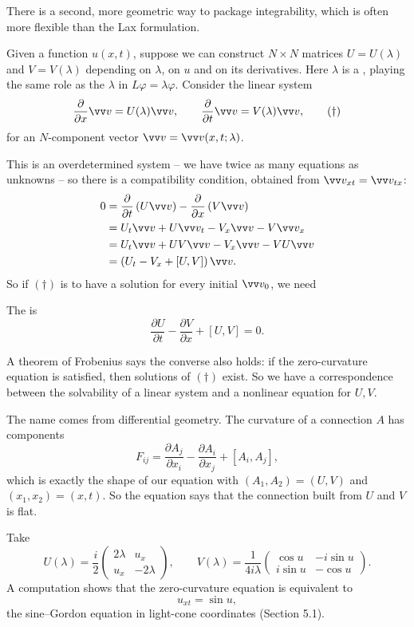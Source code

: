 There is a second, more geometric way to package integrability, which is often more flexible than the Lax formulation.

Given a function $u(x,t)$, suppose we can construct $N\times N$ matrices $U = U(\lambda)$ and $V = V(\lambda)$ depending on $\lambda$, on $u$ and on its derivatives. Here $\lambda$ is a , playing the same role as the $\lambda$ in $L\varphi = \lambda\varphi$. Consider the linear system
\begin{equation*}
\frac{\partial}{\partial x}\vv v = U(\lambda)\vv v, \qquad \frac{\partial}{\partial t}\vv v = V(\lambda)\vv v,\tag{$\dagger$}
\end{equation*}
for an $N$-component vector $\vv v = \vv v(x,t;\lambda)$.

This is an overdetermined system -- we have twice as many equations as unknowns -- so there is a compatibility condition, obtained from $\vv v_{xt} = \vv v_{tx}$:
\begin{align*}
	0 &= \frac{\partial}{\partial t}\left(U\vv v\right) - \frac{\partial}{\partial x}\left(V\vv v\right)\\
	&= U_t\vv v + U\vv v_t - V_x\vv v - V\vv v_x\\
	&= U_t\vv v + UV\vv v - V_x\vv v - VU\vv v\\
	&= \left(U_t - V_x + [U,V]\right)\vv v.
\end{align*}
So if $(\dagger)$ is to have a solution for every initial $\vv v_0$, we need

\begin{definition}
	The  is
	$$
	\frac{\partial U}{\partial t} - \frac{\partial V}{\partial x} + [U, V] = 0.
	$$
\end{definition}

A theorem of Frobenius says the converse also holds: if the zero-curvature equation is satisfied, then solutions of $(\dagger)$ exist. So we have a correspondence between the solvability of a linear system and a nonlinear equation for $U, V$.

The name comes from differential geometry. The curvature of a connection $A$ has components
$$
F_{ij} = \frac{\partial A_j}{\partial x_i} - \frac{\partial A_i}{\partial x_j} + [A_i, A_j],
$$
which is exactly the shape of our equation with $(A_1, A_2) = (U, V)$ and $(x_1, x_2) = (x, t)$. So the equation says that the connection built from $U$ and $V$ is flat.

\begin{example}
	Take
	$$
	U(\lambda) = \frac{i}{2}\begin{pmatrix}2\lambda & u_x\\ u_x & -2\lambda\end{pmatrix}, \qquad V(\lambda) = \frac{1}{4i\lambda}\begin{pmatrix}\cos u & -i\sin u\\ i\sin u & -\cos u\end{pmatrix}.
	$$
	A computation shows that the zero-curvature equation is equivalent to
	$$
	u_{xt} = \sin u,
	$$
	the sine--Gordon equation in light-cone coordinates (Section 5.1).
\end{example}

